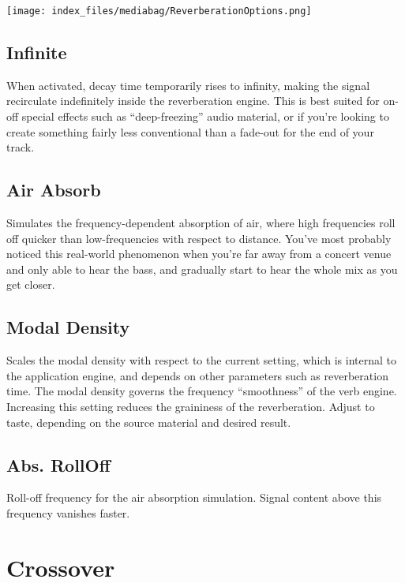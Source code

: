 \documentclass[
  letterpaper,
  DIV=11,
  numbers=noendperiod]{scrreport}
\begin{document}
\texttt{[image: index\_files/mediabag/ReverberationOptions.png]}

\hypertarget{infinite}{%
\subsection{Infinite}\label{infinite}}

When activated, decay time temporarily rises to infinity, making the
signal recirculate indefinitely inside the reverberation engine. This is
best suited for on-off special effects such as ``deep-freezing'' audio
material, or if you're looking to create something fairly less
conventional than a fade-out for the end of your track.

\hypertarget{air-absorb}{%
\subsection{Air Absorb}\label{air-absorb}}

Simulates the frequency-dependent absorption of air, where high
frequencies roll off quicker than low-frequencies with respect to
distance. You've most probably noticed this real-world phenomenon when
you're far away from a concert venue and only able to hear the bass, and
gradually start to hear the whole mix as you get closer.

\hypertarget{modal-density}{%
\subsection{Modal Density}\label{modal-density}}

Scales the modal density with respect to the current setting, which is
internal to the application engine, and depends on other parameters such
as reverberation time. The modal density governs the frequency
``smoothness'' of the verb engine. Increasing this setting reduces the
graininess of the reverberation. Adjust to taste, depending on the
source material and desired result.

\hypertarget{abs.-rolloff}{%
\subsection{Abs. RollOff}\label{abs.-rolloff}}

Roll-off frequency for the air absorption simulation. Signal content
above this frequency vanishes faster.

\hypertarget{crossover}{%
\section{Crossover}\label{crossover}}
\end{document}

